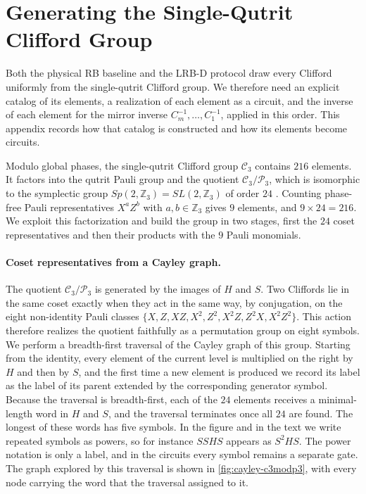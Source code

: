 \section{Generating the Single-Qutrit Clifford Group}
\label{sec:clifford-gen}

Both the physical RB baseline and the LRB-D protocol draw every Clifford uniformly from the single-qutrit Clifford group. We therefore need an explicit catalog of its elements, a realization of each element as a circuit, and the inverse of each element for the mirror inverse $C_m^{-1}, \dots, C_1^{-1}$, applied in this order. This appendix records how that catalog is constructed and how its elements become circuits.

Modulo global phases, the single-qutrit Clifford group $\mathcal{C}_3$ contains $216$ elements. It factors into the qutrit Pauli group and the quotient $\mathcal{C}_3 / \mathcal{P}_3$, which is isomorphic to the symplectic group $Sp(2,\mathbb{Z}_3) = SL(2,\mathbb{Z}_3)$ of order $24$ \cite{Appleby2005,Hostens2005}. Counting phase-free Pauli representatives $X^a Z^b$ with $a,b \in \mathbb{Z}_3$ gives $9$ elements, and $9 \times 24 = 216$. We exploit this factorization and build the group in two stages, first the $24$ coset representatives and then their products with the $9$ Pauli monomials.

\paragraph{Coset representatives from a Cayley graph.}
The quotient $\mathcal{C}_3/\mathcal{P}_3$ is generated by the images of $H$ and $S$. Two Cliffords lie in the same coset exactly when they act in the same way, by conjugation, on the eight non-identity Pauli classes $\{X, Z, XZ, X^2, Z^2, X^2Z, Z^2X, X^2Z^2\}$. This action therefore realizes the quotient faithfully as a permutation group on eight symbols. We perform a breadth-first traversal of the Cayley graph of this group. Starting from the identity, every element of the current level is multiplied on the right by $H$ and then by $S$, and the first time a new element is produced we record its label as the label of its parent extended by the corresponding generator symbol. Because the traversal is breadth-first, each of the $24$ elements receives a minimal-length word in $H$ and $S$, and the traversal terminates once all $24$ are found. The longest of these words has five symbols. In the figure and in the text we write repeated symbols as powers, so for instance $SSHS$ appears as $S^2HS$. The power notation is only a label, and in the circuits every symbol remains a separate gate. The graph explored by this traversal is shown in \autoref{fig:cayley-c3modp3}, with every node carrying the word that the traversal assigned to it.

